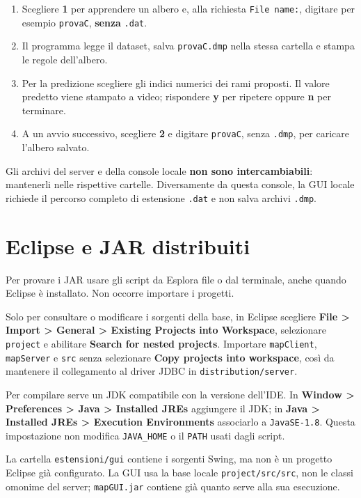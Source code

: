 \documentclass[11pt,a4paper]{article}
\begin{document}
\begin{enumerate}
  \item Scegliere \textbf{1} per apprendere un albero e, alla richiesta
        \texttt{File name:}, digitare per esempio \texttt{provaC},
        \textbf{senza} \texttt{.dat}.
  \item Il programma legge il dataset, salva \texttt{provaC.dmp} nella stessa
        cartella e stampa le regole dell'albero.
  \item Per la predizione scegliere gli indici numerici dei rami proposti.
        Il valore predetto viene stampato a video; rispondere \textbf{y} per
        ripetere oppure \textbf{n} per terminare.
  \item A un avvio successivo, scegliere \textbf{2} e digitare
        \texttt{provaC}, senza \texttt{.dmp}, per caricare l'albero salvato.
\end{enumerate}

Gli archivi del server e della console locale \textbf{non sono intercambiabili}:
mantenerli nelle rispettive cartelle. Diversamente da questa console, la GUI
locale richiede il percorso completo di estensione \texttt{.dat} e non salva
archivi \texttt{.dmp}.

\section*{Eclipse e JAR distribuiti}

Per provare i JAR usare gli script da Esplora file o dal terminale, anche quando
Eclipse è installato. Non occorre importare i progetti.

Solo per consultare o modificare i sorgenti della base, in Eclipse scegliere
\textbf{File > Import > General > Existing Projects into Workspace}, selezionare
\texttt{project} e abilitare \textbf{Search for nested projects}. Importare
\texttt{mapClient}, \texttt{mapServer} e \texttt{src} senza selezionare
\textbf{Copy projects into workspace}, così da mantenere il collegamento al
driver JDBC in \texttt{distribution/server}.

Per compilare serve un JDK compatibile con la versione dell'IDE.
In \textbf{Window > Preferences > Java > Installed JREs} aggiungere il JDK;
in \textbf{Java > Installed JREs > Execution Environments} associarlo a
\texttt{JavaSE-1.8}. Questa impostazione non modifica \texttt{JAVA\_HOME}
o il \texttt{PATH} usati dagli script.

La cartella \texttt{estensioni/gui} contiene i sorgenti Swing, ma non è un
progetto Eclipse già configurato. La GUI usa la base locale
\texttt{project/src/src}, non le classi omonime del server;
\texttt{mapGUI.jar} contiene già quanto serve alla sua esecuzione.
\end{document}
